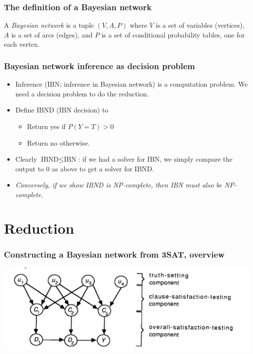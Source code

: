 \documentclass{beamer}
\begin{document}
\begin{frame}
\frametitle{The definition of a Bayesian network}
A \emph{Bayesian network} is a tuple $(V, A, P)$ where $V$ is a set of variables (vertices), $A$ is a set of arcs (edges), and $P$ is a set of conditional probability tables, one for each vertex.
\end{frame}

\begin{frame}
\frametitle{Bayesian network inference as decision problem}
\begin{itemize}
  \item Inference (IBN; inference in Bayesian network) is a computation problem. We need a decision problem to do the reduction.
  \item Define IBND (IBN decision) to
  \begin{itemize}
    \item Return {\sc yes} if $P(Y = T) > 0$
    \item Return {\sc no} otherwise.
  \end{itemize}
  \item Clearly $\text{IBND} \leq \text{IBN}$: if we had a solver for IBN, we simply compare the output to 0 as above to get a solver for IBND.
  \item \emph{Conversely, if we show IBND is NP-complete, then IBN must also be NP-complete.}
\end{itemize}
\end{frame}

\section{Reduction}
\begin{frame}
\frametitle{Constructing a Bayesian network from 3SAT, overview}
\includegraphics[width=\textwidth]{proof}
\end{frame}
\end{document}
